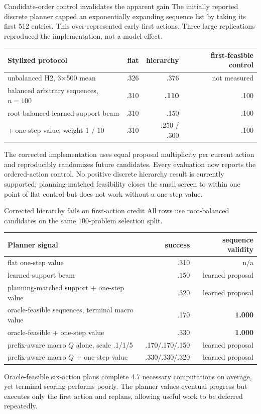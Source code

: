 \documentclass[aspectratio=169,10pt]{beamer}
\newcommand{\good}[1]{\textcolor{cgreen}{\textbf{#1}}}
\newcommand{\bad}[1]{\textcolor{cred}{\textbf{#1}}}
\begin{document}
\begin{frame}{Candidate-order control invalidates the apparent gain}
\small
The initially reported discrete planner capped an exponentially expanding
sequence list by taking its first 512 entries. This over-represented early
first actions. Three large replications reproduced the implementation, not a
model effect.

\medskip
\centering
\begin{tabular}{lrrr}
\toprule
Stylized protocol & flat & hierarchy & first-feasible control\\
\midrule
unbalanced H2, 3$\times$500 mean & .326 & .376 & not measured\\
balanced arbitrary sequences, $n=100$ & .310 & \bad{.110} & .100\\
root-balanced learned-support beam & .310 & .150 & .100\\
$+$ one-step value, weight 1 / 10 & .310 & .250 / .300 & .100\\
\bottomrule
\end{tabular}

\medskip
The corrected implementation uses equal proposal multiplicity per current
action and reproducibly randomizes future candidates. Every evaluation now
reports the ordered-action control. No positive discrete hierarchy result is
currently supported; planning-matched feasibility closes the small screen to
within one point of flat control but does not work without a one-step value.
\end{frame}

\begin{frame}{Corrected hierarchy fails on first-action credit}
\small
All rows use root-balanced candidates on the same 100-problem selection split.

\medskip
\centering
\begin{tabular}{lrr}
\toprule
Planner signal & success & sequence validity\\
\midrule
flat one-step value & .310 & n/a\\
learned-support beam & .150 & learned proposal\\
planning-matched support + one-step value & .320 & learned proposal\\
oracle-feasible sequences, terminal macro value & .170 & \good{1.000}\\
oracle-feasible + one-step value & .330 & \good{1.000}\\
prefix-aware macro $Q$ alone, scale .1/1/5 & .170/.170/.150 & learned proposal\\
prefix-aware macro $Q$ + one-step value & .330/.330/.320 & learned proposal\\
\bottomrule
\end{tabular}

\medskip
Oracle-feasible six-action plans complete 4.7 necessary computations on
average, yet terminal scoring performs poorly. The planner values eventual
progress but executes only the first action and replans, allowing useful work
to be deferred repeatedly.
\end{frame}
\end{document}
